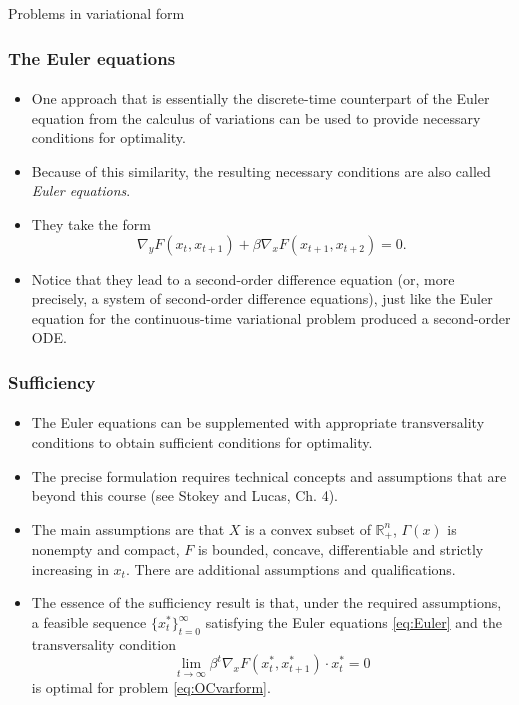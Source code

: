 \documentclass[10pt]{beamer}
\theoremstyle{definition}
\begin{document}
\begin{section}{Problems in variational form}
\begin{frame}[fragile]
\frametitle{The Euler equations}
\framesubtitle{}
\begin{itemize}\itemsep1em
\item One approach that is essentially the discrete-time counterpart of the Euler equation from the calculus of variations can be used to provide necessary conditions for optimality.
\item Because of this similarity, the resulting necessary conditions are also called \emph{Euler equations}.
\item They take the form
\begin{equation}\label{eq:Euler}
\nabla_y F(x_t,x_{t+1})+\beta \nabla_x F(x_{t+1},x_{t+2})=0.
\end{equation}
\item Notice that they lead to a second-order difference equation (or, more precisely, a system of second-order difference equations), just like the Euler equation for the continuous-time variational problem produced a second-order ODE.
\end{itemize}
\end{frame}

\begin{frame}[fragile]
\frametitle{Sufficiency}
\framesubtitle{}
\begin{itemize}\itemsep1em
\item The Euler equations can be supplemented with appropriate transversality conditions to obtain sufficient conditions for optimality.
\item The precise formulation requires technical concepts and assumptions that are beyond this course (see Stokey and Lucas, Ch. 4).
\item The main assumptions are that $ X $ is a convex subset of $ \mathbb{R}^n_{+} $, $ \Gamma (x) $ is nonempty and compact, $ F $ is bounded, concave, differentiable and strictly increasing in $ x_t $. There are additional assumptions and qualifications.
\item The essence of the sufficiency result is that, under the required assumptions, a feasible sequence $ \{x^*_t\}_{t=0}^{\infty} $ satisfying the Euler equations \eqref{eq:Euler} and the transversality condition \[ \lim\limits_{t\rightarrow \infty}\beta^t \nabla_x F(x_t^*,x_{t+1}^*)\cdot x^*_t = 0 \] is optimal for problem \eqref{eq:OCvarform}.
\end{itemize}


\end{frame}




\end{section}
\end{document}
